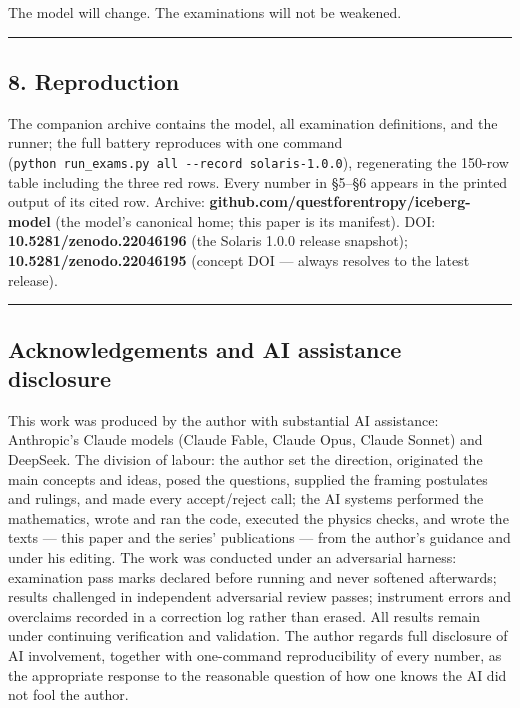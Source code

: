 \documentclass[
  11pt,
]{article}
\begin{document}
The model will change. The examinations will not be weakened.

\begin{center}\rule{0.5\linewidth}{0.5pt}\end{center}

\subsection{8. Reproduction}\label{reproduction}

The companion archive contains the model, all examination definitions,
and the runner; the full battery reproduces with one command
(\texttt{python\ run\_exams.py\ all\ -\/-record\ solaris-1.0.0}),
regenerating the 150-row table including the three red rows. Every
number in \S{}5--\S{}6 appears in the printed output of its cited row.
Archive: \textbf{github.com/questforentropy/iceberg-model} (the model's
canonical home; this paper is its manifest). DOI:
\textbf{10.5281/zenodo.22046196} (the Solaris 1.0.0 release snapshot);
\textbf{10.5281/zenodo.22046195} (concept DOI --- always resolves to the
latest release).

\begin{center}\rule{0.5\linewidth}{0.5pt}\end{center}

\subsection{Acknowledgements and AI assistance
disclosure}\label{acknowledgements-and-ai-assistance-disclosure}

This work was produced by the author with substantial AI assistance:
Anthropic's Claude models (Claude Fable, Claude Opus, Claude Sonnet) and
DeepSeek. The division of labour: the author set the direction,
originated the main concepts and ideas, posed the questions, supplied
the framing postulates and rulings, and made every accept/reject call;
the AI systems performed the mathematics, wrote and ran the code,
executed the physics checks, and wrote the texts --- this paper and the
series' publications --- from the author's guidance and under his
editing. The work was conducted under an adversarial harness:
examination pass marks declared before running and never softened
afterwards; results challenged in independent adversarial review passes;
instrument errors and overclaims recorded in a correction log rather
than erased. All results remain under continuing verification and
validation. The author regards full disclosure of AI involvement,
together with one-command reproducibility of every number, as the
appropriate response to the reasonable question of how one knows the AI
did not fool the author.
\end{document}
